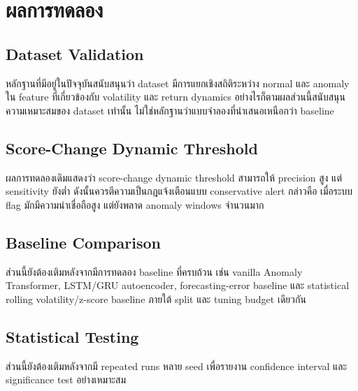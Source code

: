 \chapter{ผลการทดลอง}

\section{Dataset Validation}

หลักฐานที่มีอยู่ในปัจจุบันสนับสนุนว่า dataset มีการแยกเชิงสถิติระหว่าง normal และ anomaly ใน feature ที่เกี่ยวข้องกับ volatility และ return dynamics อย่างไรก็ตามผลส่วนนี้สนับสนุนความเหมาะสมของ dataset เท่านั้น ไม่ใช่หลักฐานว่าแบบจำลองที่นำเสนอเหนือกว่า baseline

\section{Score-Change Dynamic Threshold}

ผลการทดลองเดิมแสดงว่า score-change dynamic threshold สามารถให้ precision สูง แต่ sensitivity ยังต่ำ ดังนั้นควรตีความเป็นกฎแจ้งเตือนแบบ conservative alert กล่าวคือ เมื่อระบบ flag มักมีความน่าเชื่อถือสูง แต่ยังพลาด anomaly windows จำนวนมาก

\section{Baseline Comparison}

ส่วนนี้ยังต้องเติมหลังจากมีการทดลอง baseline ที่ครบถ้วน เช่น vanilla Anomaly Transformer, LSTM/GRU autoencoder, forecasting-error baseline และ statistical rolling volatility/z-score baseline ภายใต้ split และ tuning budget เดียวกัน

\section{Statistical Testing}

ส่วนนี้ยังต้องเติมหลังจากมี repeated runs หลาย seed เพื่อรายงาน confidence interval และ significance test อย่างเหมาะสม

